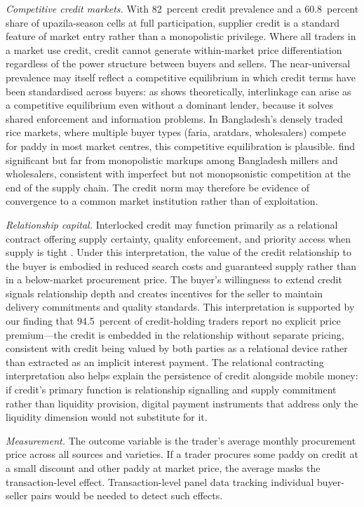 \documentclass[authoryear,preprint,review,12pt]{elsarticle}
\begin{document}
\textit{Competitive credit markets.} With 82~percent credit prevalence and
a 60.8~percent share of upazila-season cells at full participation, supplier
credit is a standard feature of market entry rather than a monopolistic
privilege. Where all traders in a market use credit, credit cannot generate
within-market price differentiation regardless of the power structure between
buyers and sellers. The near-universal prevalence may itself reflect a
competitive equilibrium in which credit terms have been standardised across
buyers: as \citet{basu1983} shows theoretically, interlinkage can arise
as a competitive equilibrium even without a dominant lender, because it
solves shared enforcement and information problems. In Bangladesh's densely
traded rice markets, where multiple buyer types (faria, aratdars, wholesalers)
compete for paddy in most market centres, this competitive equilibration
is plausible. \citet{rahman_etal2020} find significant but far from monopolistic
markups among Bangladesh millers and wholesalers, consistent with imperfect
but not monopsonistic competition at the end of the supply chain.
The credit norm may therefore be evidence of convergence to a common
market institution rather than of exploitation.

\textit{Relationship capital.} Interlocked credit may function primarily as
a relational contract offering supply certainty, quality enforcement,
and priority access when supply is tight
\citep{casaburi_macchiavello2019, blouin_macchiavello2019,
macchiavello_morjaria2015}. Under this interpretation, the value of
the credit relationship to the buyer is embodied in reduced search costs
and guaranteed supply rather than in a below-market procurement price.
The buyer's willingness to extend credit signals relationship depth and
creates incentives for the seller to maintain delivery commitments and
quality standards. This interpretation is supported by our finding that
94.5~percent of credit-holding traders report no explicit price premium---the
credit is embedded in the relationship without separate pricing, consistent
with credit being valued by both parties as a relational device rather
than extracted as an implicit interest payment. The relational contracting
interpretation also helps explain the persistence of credit alongside
mobile money: if credit's primary function is relationship signalling
and supply commitment rather than liquidity provision, digital payment
instruments that address only the liquidity dimension would not substitute
for it.

\textit{Measurement.} The outcome variable is the trader's average monthly
procurement price across all sources and varieties. If a trader procures
some paddy on credit at a small discount and other paddy at market price,
the average masks the transaction-level effect. Transaction-level panel
data tracking individual buyer-seller pairs would be needed to detect
such effects.
\end{document}
